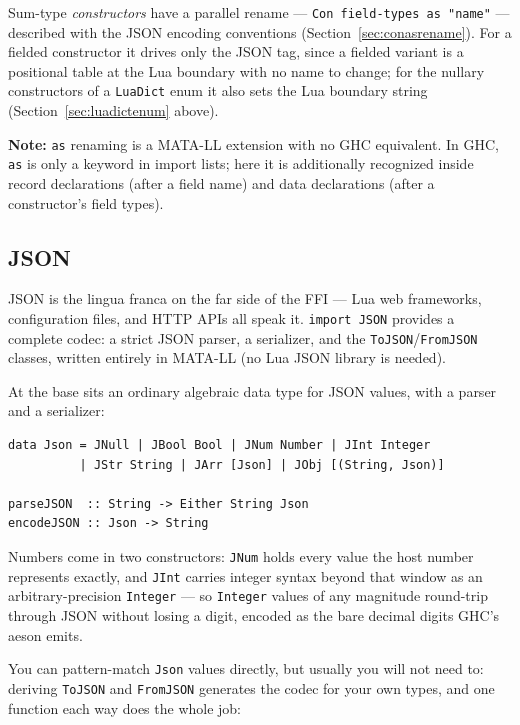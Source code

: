 \documentclass[11pt,a4paper]{article}
\newenvironment{note}{%
  \def\FrameCommand{\fboxsep=3mm \colorbox{notebg}}%
  \MakeFramed{\advance\hsize-\width \FrameRestore}%
  \noindent\textbf{Note:} }%
  {\endMakeFramed}
\begin{document}
Sum-type \emph{constructors} have a parallel rename ---
\texttt{Con field-types as "name"} --- described with the JSON
encoding conventions (Section~\ref{sec:conasrename}).  For a fielded
constructor it drives only the JSON tag, since a fielded variant is a
positional table at the Lua boundary with no name to change; for the
nullary constructors of a \texttt{LuaDict} enum it also sets the Lua
boundary string (Section~\ref{sec:luadictenum} above).

\begin{note}
\texttt{as} renaming is a MATA-LL extension with no GHC equivalent.
In GHC, \texttt{as} is only a keyword in import lists; here it is
additionally recognized inside record declarations (after a field
name) and data declarations (after a constructor's field types).
\end{note}

\subsection{JSON}
\label{sec:json}

JSON is the lingua franca on the far side of the FFI --- Lua web
frameworks, configuration files, and HTTP APIs all speak it.
\texttt{import JSON} provides a complete codec: a strict JSON parser, a
serializer, and the \texttt{ToJSON}/\texttt{FromJSON} classes, written
entirely in MATA-LL (no Lua JSON library is needed).

At the base sits an ordinary algebraic data type for JSON values, with
a parser and a serializer:

\begin{lstlisting}
data Json = JNull | JBool Bool | JNum Number | JInt Integer
          | JStr String | JArr [Json] | JObj [(String, Json)]

parseJSON  :: String -> Either String Json
encodeJSON :: Json -> String
\end{lstlisting}

Numbers come in two constructors: \texttt{JNum} holds every value the
host number represents exactly, and \texttt{JInt} carries integer
syntax beyond that window as an arbitrary-precision \texttt{Integer} ---
so \texttt{Integer} values of any magnitude round-trip through JSON
without losing a digit, encoded as the bare decimal digits GHC's aeson
emits.

You can pattern-match \texttt{Json} values directly, but usually you
will not need to: deriving \texttt{ToJSON} and \texttt{FromJSON}
generates the codec for your own types, and one function each way does
the whole job:
\end{document}
